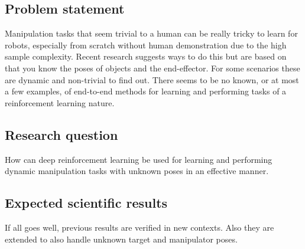 \subsection{Problem statement}

Manipulation tasks that seem trivial to a human can be really tricky to learn
for robots, especially from scratch without human demonstration due to the high
sample complexity. Recent research suggests ways to do this but are based on
that you know the poses of objects and the end-effector. For some scenarios
these are dynamic and non-trivial to find out. There seems to be no known, or
at most a few examples, of end-to-end methods for learning and performing tasks
of a reinforcement learning nature.

\subsection{Research question}

How can deep reinforcement learning be used for learning and performing dynamic
manipulation tasks with unknown poses in an effective manner.

\subsection{Expected scientific results}
If all goes well, previous results are verified in new contexts. Also
they are extended to also handle unknown target and manipulator poses.
